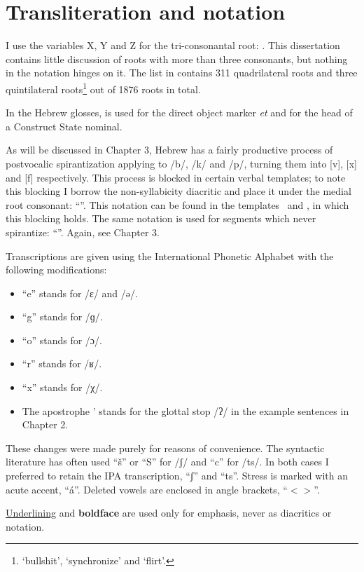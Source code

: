 \section{Transliteration and notation} \label{sec:data:notation}
I use the variables X, Y and Z for the tri-consonantal root: . This dissertation contains little discussion of roots with more than three consonants, but nothing in the notation hinges on it. The list in \cite{ehrenfeld12} contains 311 quadrilateral roots and three quintilateral roots\footnote{ `bullshit',  `synchronize' and  `flirt'.} out of 1876 roots in total.

In the Hebrew glosses,  is used for the direct object marker \emph{et} and  for the head of a Construct State nominal.

As will be discussed in Chapter 3, Hebrew has a fairly productive process of postvocalic spirantization applying to /b/, /k/ and /p/, turning them into [v], [x] and [f] respectively. This process is blocked in certain verbal templates; to note this blocking I borrow the non-syllabicity diacritic and place it under the medial root consonant: ``''. This notation can be found in the templates \tpie~and \thit, in which this blocking holds. The same notation is used for segments which never spirantize: ``''. Again, see Chapter 3.

Transcriptions are given using the International Phonetic Alphabet with the following modifications:
\begin{itemize}
	\item ``e'' stands for /ɛ/ and /ə/.
	\item ``g'' stands for /ɡ/.
	\item ``o'' stands for /ɔ/.
	\item ``r'' stands for /ʁ/.
	\item ``x'' stands for /χ/.
	\item The apostrophe ' stands for the glottal stop /ʔ/ in the example sentences in Chapter 2.
\end{itemize}
These changes were made purely for reasons of convenience. The syntactic literature has often used ``\v{s}'' or ``S'' for /ʃ/ and ``c'' for /ts/. In both cases I preferred to retain the IPA transcription, ``ʃ'' and ``ts''. Stress is marked with an acute accent, ``\'a''. Deleted vowels are enclosed in angle brackets, ``$<>$''.

\underline{Underlining} and \textbf{boldface} are used only for emphasis, never as diacritics or notation.

